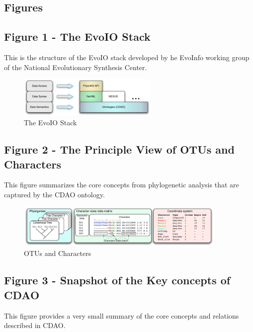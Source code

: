\documentclass[10pt]{bmc_article}
\newenvironment{bmcformat}{\begin{raggedright}\baselineskip20pt\sloppy\setboolean{publ}{false}}{\end{raggedright}\baselineskip20pt\sloppy}
\begin{document}
\begin{bmcformat}


\section*{Figures}

\subsection*{Figure 1 - The EvoIO Stack}
This is the structure of the EvoIO stack developed by he EvoInfo working
group of the National Evolutionary Synthesis Center.

\begin{figure}[h]
\centerline{\includegraphics[width=0.6\textwidth]{EvoioStack.pdf}}
\caption{The EvoIO Stack}
\label{stack}
\end{figure}

\subsection*{Figure 2 - The Principle View of OTUs and Characters}
This figure summarizes the core concepts from phylogenetic analysis that
are captured by the CDAO ontology.

\begin{figure}[h]
\centerline{\includegraphics[width=0.9\textwidth]{cdofig.pdf}}
\caption{OTUs and Characters}
\label{cdao1}
\end{figure}

\subsection*{Figure 3 - Snapshot of the Key concepts of CDAO}
This figure provides a very small summary of the core concepts and relations
described in CDAO.


\end{bmcformat}
\end{document}
